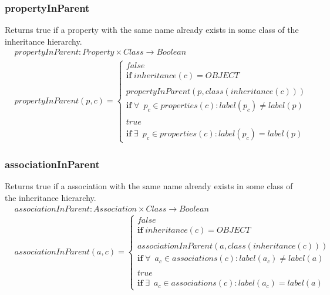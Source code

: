 \documentclass[10pt]{article}
\begin{document}
\subsubsection{propertyInParent}
Returns true if a property with the same name already exists in some class of the inheritance hierarchy.
\begin{align}
& propertyInParent: Property \times Class \rightarrow Boolean \\
& propertyInParent(p, c) = \begin{cases}
 false \\
 \mathbf{if} \; inheritance(c) = OBJECT \\ \\
 propertyInParent(p, class(inheritance(c))) \\
 \mathbf{if} \; \forall \: \; p_c \in properties(c) : label(p_c) \neq label(p) \\ \\
 true \\
 \mathbf{if} \; \exists \:  \; p_c \in properties(c) : label(p_c) = label(p) 
 \end{cases}
\end{align}

\subsubsection{associationInParent}
Returns true if a association with the same name already exists in some class of the inheritance hierarchy.
\begin{align}
& associationInParent: Association \times Class \rightarrow Boolean \\
& associationInParent(a, c) = \begin{cases}
 false \\
 \mathbf{if} \; inheritance(c) = OBJECT \\ \\
 associationInParent(a, class(inheritance(c))) \\
 \mathbf{if} \; \forall \: \; a_c \in associations(c) : label(a_c) \neq label(a) \\ \\
 true \\
 \mathbf{if} \; \exists \:  \; a_c \in associations(c) : label(a_c) = label(a) 
 \end{cases}
\end{align}
\end{document}
